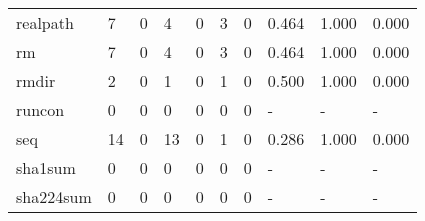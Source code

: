 \begin{longtable}{lp{1.3cm}p{1.3cm}p{1.3cm}p{1.3cm}p{1.3cm}p{1.3cm}p{1.3cm}p{1.3cm}p{1.3cm}}
realpath  &                      7 &                                  0 &                                 4 &                                0 &                                 3 &                               0 &                                0.464 &                                  1.000 &                                0.000 \\
rm        &                      7 &                                  0 &                                 4 &                                0 &                                 3 &                               0 &                                0.464 &                                  1.000 &                                0.000 \\
rmdir     &                      2 &                                  0 &                                 1 &                                0 &                                 1 &                               0 &                                0.500 &                                  1.000 &                                0.000 \\
runcon    &                      0 &                                  0 &                                 0 &                                0 &                                 0 &                               0 &                                    - &                                      - &                                    - \\
seq       &                     14 &                                  0 &                                13 &                                0 &                                 1 &                               0 &                                0.286 &                                  1.000 &                                0.000 \\
sha1sum   &                      0 &                                  0 &                                 0 &                                0 &                                 0 &                               0 &                                    - &                                      - &                                    - \\
sha224sum &                      0 &                                  0 &                                 0 &                                0 &                                 0 &                               0 &                                    - &                                      - &                                    - \\

\end{longtable}
